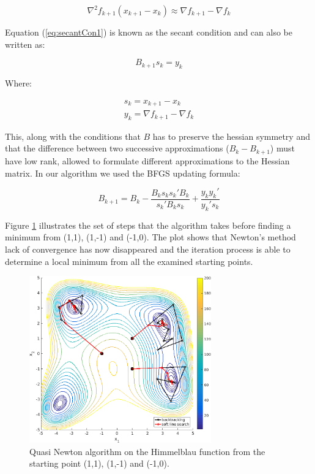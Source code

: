 \begin{equation}
\nabla^2 f_{k+1} (x_{k+1} - x_k) \approx \nabla f_{k+1} - \nabla f_k
\label{eq:secantCon1}
\end{equation}

Equation (\ref{eq:secantCon1}) is known as the secant condition and can also be written as:

\begin{equation}
B_{k+1} s_k = y_k
\label{eq:secantCon2}
\end{equation}

Where:


\begin{gather}
s_k = x_{k+1}-x_k \\
y_k = \nabla f_{k+1} - \nabla f_k
\label{eq:secantCon3}
\end{gather}

This, along with the conditions that $B$ has to preserve the hessian symmetry and that the difference between two successive approximations ($B_k - B_{k+1}$) must have low rank, allowed to formulate different approximations to the Hessian matrix.
In our algorithm we used the BFGS updating formula:

\begin{equation}
B_{k+1} = B_k - \frac{B_k s_k s_k' B_k}{s_k' B_k s_k} + \frac{y_k y_k'}{y_k' s_k}
\label{eq:BFGS}
\end{equation}

Figure \ref{fig:quasiNewton} illustrates the set of steps that the algorithm takes before finding a minimum from (1,1), (1,-1) and (-1,0). The plot shows that Newton's method lack of convergence has now disappeared and the iteration process is able to determine a local minimum from all the examined starting points.

\begin{figure}[htb]
\centering
\includegraphics[width=0.7\textwidth]{../img/quasiNewton}
\caption{Quasi Newton algorithm on the Himmelblau function from the starting point (1,1), (1,-1) and (-1,0).}
\label{fig:quasiNewton}
\end{figure}

